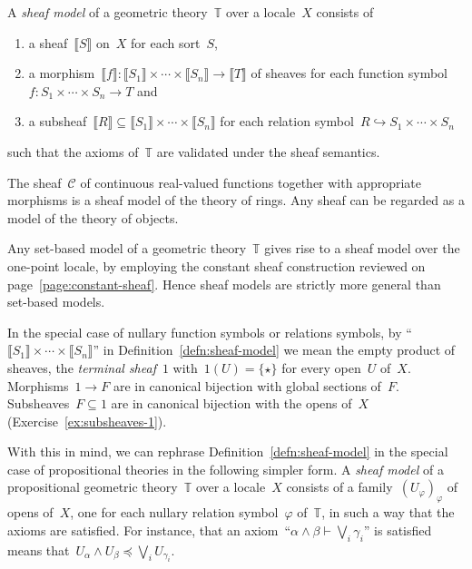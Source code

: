 \documentclass{ws-rv9x6}
\newcommand{\C}{\mathcal{C}}
\newcommand{\TT}{\mathbb{T}}
\renewcommand{\_}{\mathpunct{.}}
\newcommand{\?}{\,{:}\,}
\newcommand{\brak}[1]{{\llbracket{#1}\rrbracket}}
\begin{document}
\begin{definition}\label{defn:sheaf-model}
A \emph{sheaf model} of a geometric theory~$\TT$ over a locale~$X$ consists of
\begin{enumerate}
  \item a sheaf~$\brak{S}$ on~$X$ for each sort~$S$,
  \item a morphism~$\brak{f} : \brak{S_1} \times \cdots \times \brak{S_n} \to
  \brak{T}$ of sheaves for each function symbol~$f : S_1 \times \cdots \times S_n \to T$ and
  \item a subsheaf~$\brak{R} \subseteq \brak{S_1} \times \cdots \times \brak{S_n}$
  for each relation symbol~$R \hookrightarrow S_1 \times \cdots \times S_n$
\end{enumerate}
such that the axioms of~$\TT$ are validated under the sheaf semantics.
\end{definition}

\begin{example}The sheaf~$\C$ of continuous real-valued functions together with
appropriate morphisms is a sheaf model of the theory of rings. Any sheaf can be
regarded as a model of the theory of objects.\end{example}

\begin{example}\label{ex:sets-as-sheaf-models}
Any set-based model of a geometric theory~$\TT$ gives rise to a
sheaf model over the one-point locale, by employing the constant sheaf
construction reviewed on page~\ref{page:constant-sheaf}. Hence sheaf models are strictly more general than
set-based models.
\end{example}

In the special case of nullary function symbols or relations symbols, by
``$\brak{S_1} \times \cdots \times \brak{S_n}$'' in
Definition~\ref{defn:sheaf-model} we mean the empty product of sheaves, the
\emph{terminal sheaf}~$1$ with~$1(U) = \{\star\}$ for every open~$U$ of~$X$.
Morphisms~$1 \to F$ are in canonical bijection with global sections of~$F$.
Subsheaves~$F \subseteq 1$ are in canonical bijection with the opens of~$X$
(Exercise~\ref{ex:subsheaves-1}).

With this in mind, we can rephrase Definition~\ref{defn:sheaf-model} in the
special case of propositional theories in the following simpler form. A
\emph{sheaf model} of a propositional geometric theory~$\TT$ over a locale~$X$
consists of a family~$(U_\varphi)_\varphi$ of opens of~$X$, one for each
nullary relation symbol~$\varphi$ of~$\TT$, in such a way that the axioms are
satisfied. For instance, that an axiom~``$\alpha \wedge \beta \vdash \bigvee_i
\gamma_i$'' is satisfied means that~$U_\alpha \wedge U_\beta \preceq \bigvee_i
U_{\gamma_i}$.
\end{document}
